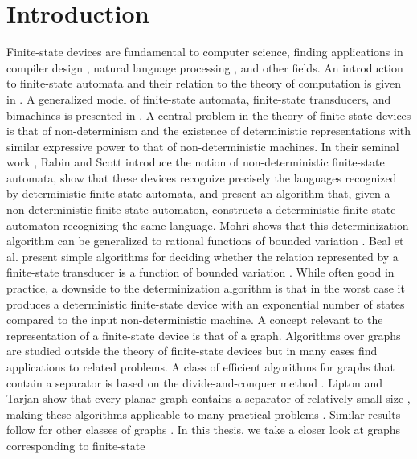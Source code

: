 \chapter{Introduction}

Finite-state devices are fundamental to computer science, finding applications in
compiler design \cite{aho_lam_sethi_ullman}, natural language processing
\cite{mohri_applications}, and other fields. An introduction to finite-state
automata and their relation to the theory of computation is given in
\cite{hopcroft_motwani_ullman}. A generalized model of finite-state automata,
finite-state transducers, and bimachines is presented in \cite{mihov_schulz}.
\bigbreak
A central problem in the theory of finite-state devices is that of non-determinism
and the existence of deterministic representations with similar expressive power to
that of non-deterministic machines.
In their seminal work \cite{rabin_scott}, Rabin and Scott introduce the notion of
non-deterministic finite-state automata, show that these devices recognize precisely
the languages recognized by deterministic finite-state automata, and present an
algorithm that, given a non-deterministic finite-state automaton, constructs a
deterministic finite-state automaton recognizing the same language. Mohri shows that
this determinization algorithm can be generalized to rational functions of bounded
variation \cite{mohri_applications}. Beal et al. present simple algorithms for
deciding whether the relation represented by a finite-state transducer is a function
of bounded variation \cite{beal}. While often good in practice, a downside to the
determinization algorithm is that in the worst case it produces a deterministic
finite-state device with an exponential number of states compared to the input
non-deterministic machine.
\bigbreak
A concept relevant to the representation of a finite-state device is that of a graph.
Algorithms over graphs are studied outside the theory of finite-state devices but in
many cases find applications to related problems. A class of efficient algorithms for
graphs that contain a separator is based on the divide-and-conquer method
\cite{aho_hopcroft}. Lipton and Tarjan show that every planar graph contains a
separator of relatively small size \cite{lipton_tarjan_theorem}, making these
algorithms applicable to many practical problems \cite{lipton_tarjan_applications}.
Similar results follow for other classes of graphs \cite{gilbert_hutchinson_tarjan}
\cite{alon_seymour_thomas}.
\bigbreak
In this thesis, we take a closer look at graphs corresponding to finite-state

